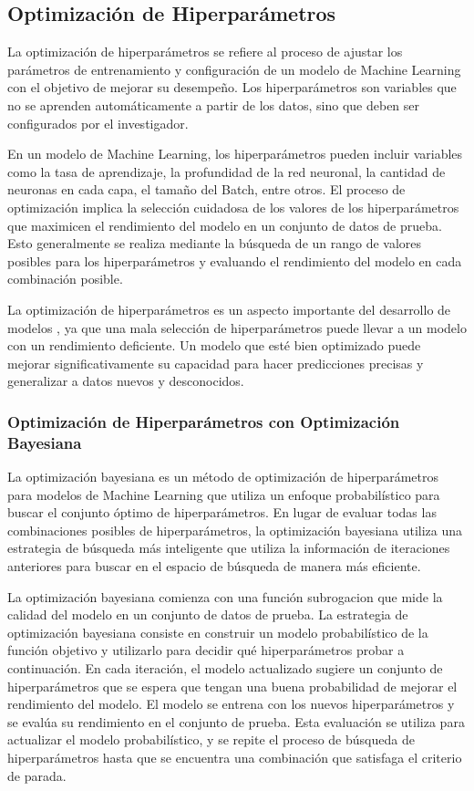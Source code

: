 \subsection{Optimización de Hiperparámetros}
La optimización de hiperparámetros se refiere al proceso de ajustar los parámetros 
de entrenamiento y configuración de un modelo de Machine Learning con el objetivo de 
mejorar su desempeño. Los hiperparámetros son variables que no se aprenden automáticamente 
a partir de los datos, sino que deben ser configurados por el investigador.\medskip

En un modelo de Machine Learning, los hiperparámetros pueden incluir variables como 
la tasa de aprendizaje, la profundidad de la red neuronal, la cantidad de neuronas en 
cada capa, el tamaño del Batch, entre otros. El proceso de optimización implica la 
selección cuidadosa de los valores de los hiperparámetros que maximicen el rendimiento 
del modelo en un conjunto de datos de prueba. Esto generalmente se realiza mediante 
la búsqueda de un rango de valores posibles para los hiperparámetros y evaluando el 
rendimiento del modelo en cada combinación posible.\medskip

La optimización de hiperparámetros es un aspecto importante del desarrollo de modelos 
, ya que una mala selección de hiperparámetros puede llevar a un modelo con un rendimiento 
deficiente. Un modelo que esté bien optimizado puede mejorar significativamente su 
capacidad para hacer predicciones precisas y generalizar a datos nuevos y desconocidos.

\subsubsection{Optimización de Hiperparámetros con Optimización Bayesiana}
La optimización bayesiana es un método de optimización de hiperparámetros para modelos 
de Machine Learning que utiliza un enfoque probabilístico para buscar el conjunto 
óptimo de hiperparámetros. En lugar de evaluar todas las combinaciones posibles de 
hiperparámetros, la optimización bayesiana utiliza una estrategia de búsqueda más 
inteligente que utiliza la información de iteraciones anteriores para buscar en el 
espacio de búsqueda de manera más eficiente.\medskip

La optimización bayesiana comienza con una función subrogacion que mide la calidad del modelo 
en un conjunto de datos de prueba. La estrategia de optimización bayesiana consiste en construir 
un modelo probabilístico de la función objetivo y utilizarlo para decidir qué hiperparámetros 
probar a continuación. En cada iteración, el modelo actualizado sugiere un conjunto de 
hiperparámetros que se espera que tengan una buena probabilidad de mejorar el rendimiento 
del modelo. El modelo se entrena con los nuevos hiperparámetros y se evalúa 
su rendimiento en el conjunto de prueba. Esta evaluación se utiliza para actualizar el 
modelo probabilístico, y se repite el proceso de búsqueda de hiperparámetros hasta 
que se encuentra una combinación que satisfaga el criterio de parada.

